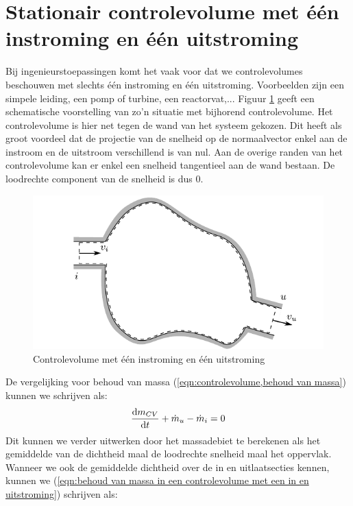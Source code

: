 	\section{Stationair controlevolume met één instroming en één uitstroming}	
Bij ingenieurstoepassingen komt het vaak voor dat we controlevolumes beschouwen met slechts één instroming en één uitstroming. Voorbeelden zijn een simpele leiding, een pomp of turbine, een reactorvat,... 
Figuur \ref{fig:controlevolume een in en uitstroming} geeft een schematische voorstelling van zo'n situatie met bijhorend controlevolume. Het controlevolume is hier net tegen de wand van het systeem gekozen. Dit heeft als groot voordeel dat de projectie van de snelheid op de normaalvector enkel aan de instroom en de uitstroom verschillend is van nul. Aan de overige randen van het controlevolume kan er enkel een snelheid tangentieel aan de wand bestaan. De loodrechte component van de snelheid is dus $0$.
\begin{figure}[htb]
	\centering
	\includegraphics{fig/controlevolumes/Controlevolume_een_in_en_uitstroming}
	\caption{Controlevolume met één instroming en één uitstroming}
	\label{fig:controlevolume een in en uitstroming}
\end{figure}
De vergelijking voor behoud van massa (\ref{eqn:controlevolume,behoud van massa}) kunnen we schrijven als:
\begin{equation}
	\dfrac{\mathrm{d} m_{CV}}{\mathrm{d} t} + \dot{m}_{u} - \dot{m}_{i} = 0
	\label{eqn:behoud van massa in een controlevolume met een in en uitstroming}
\end{equation}
Dit kunnen we verder uitwerken door het massadebiet te berekenen als  het gemiddelde van de dichtheid maal de loodrechte snelheid maal het oppervlak. Wanneer we ook de gemiddelde dichtheid over de in en uitlaatsecties kennen, kunnen we (\ref{eqn:behoud van massa in een controlevolume met een in en uitstroming}) schrijven als:

